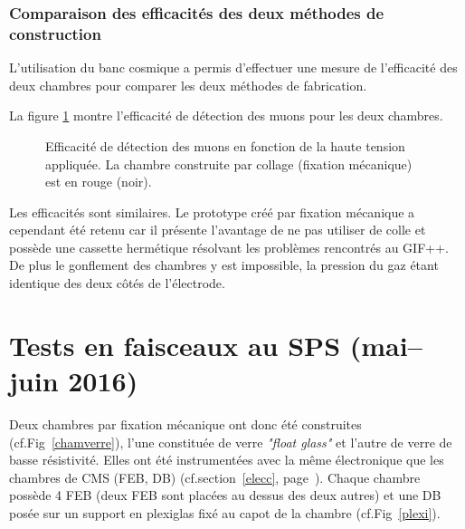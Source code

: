  \subsubsection{Comparaison des efficacités des deux méthodes de construction}
 \label{BANCC}
L'utilisation du banc cosmique a permis d'effectuer une mesure de l'efficacité des deux chambres pour comparer les deux méthodes de fabrication.

La figure \ref{comparaison2} montre l'efficacité de détection des muons pour les deux chambres.

\begin{figure}[!ht]
	\centering
	\caption{Efficacité de détection des muons en fonction de la haute tension appliquée. La chambre construite par collage (fixation mécanique) est en rouge (noir).}
	\label{comparaison2}
\end{figure}

Les efficacités sont similaires. Le prototype créé par fixation mécanique a cependant été retenu car il présente l'avantage de ne pas utiliser de colle et possède une cassette hermétique résolvant les problèmes rencontrés au GIF++. De plus le gonflement des chambres y est impossible, la pression du gaz étant identique des deux côtés de l'électrode.

\section{Tests en faisceaux au SPS (mai--juin 2016)}
\label{SPSS2}
Deux chambres par fixation mécanique ont donc été construites (cf.Fig~\ref{chamverre}), l'une constituée de verre \textit{"float glass"} et l'autre de verre de basse résistivité. Elles ont été instrumentées avec la même électronique que les chambres de CMS (FEB, DB) (cf.section~\ref{elecc}, page~\pageref{elecc}). Chaque chambre possède \num{4} FEB (deux FEB sont placées au dessus des deux autres) et une DB posée sur un support en plexiglas fixé au capot de la chambre (cf.Fig~\ref{plexi}).

